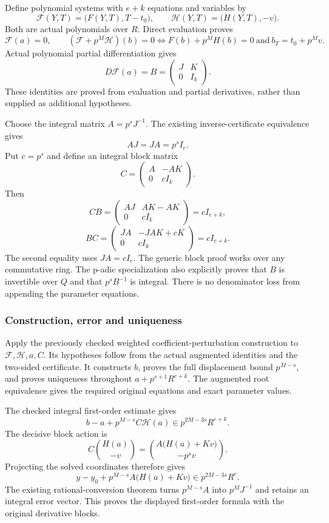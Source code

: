 Define polynomial systems with \(e+k\) equations and variables by \[
\mathcal F(Y,T)=\bigl(F(Y,T),T-t_0\bigr),\qquad
\mathcal H(Y,T)=\bigl(H(Y,T),-v\bigr).
\] Both are actual polynomials over \(R\). Direct evaluation proves \[
\mathcal F(a)=0,
\qquad
(\mathcal F+p^M\mathcal H)(b)=0
\iff F(b)+p^MH(b)=0\ \text{and}\ b_T=t_0+p^Mv.
\] Actual polynomial partial differentiation gives \[
D\mathcal F(a)=B=\begin{pmatrix}J&K\\0&I_k\end{pmatrix}.
\] These identities are proved from evaluation and partial derivatives,
rather than supplied as additional hypotheses.

Choose the integral matrix \(A=p^sJ^{-1}\). The existing
inverse-certificate equivalence gives \[
AJ=JA=p^sI_e.
\] Put \(c=p^s\) and define an integral block matrix \[
C=\begin{pmatrix}A&-AK\\0&cI_k\end{pmatrix}.
\] Then \[
CB=\begin{pmatrix}AJ&AK-AK\\0&cI_k\end{pmatrix}=cI_{e+k},
\] \[
BC=\begin{pmatrix}JA&-JAK+cK\\0&cI_k\end{pmatrix}=cI_{e+k}.
\] The second equality uses \(JA=cI_e\). The generic block proof works
over any commutative ring. The p-adic specialization also explicitly
proves that \(B\) is invertible over \(Q\) and that \(p^sB^{-1}\) is
integral. There is no denominator loss from appending the parameter
equations.

\hypertarget{cont10:construction-error-and-uniqueness}{%
\subsubsection{Construction, error and
uniqueness}\label{cont10:construction-error-and-uniqueness}}

Apply the previously checked weighted coefficient-perturbation
construction to \(\mathcal F,\mathcal H,a,C\). Its hypotheses follow
from the actual augmented identities and the two-sided certificate. It
constructs \(b\), proves the full displacement bound \(p^{M-s}\), and
proves uniqueness throughout \(a+p^{s+1}R^{e+k}\). The augmented root
equivalence gives the required original equations and exact parameter
values.

The checked integral first-order estimate gives \[
b-a+p^{M-s}C\mathcal H(a)\in p^{2M-3s}R^{e+k}.
\] The decisive block action is \[
C\binom{H(a)}{-v}
=
\binom{A\bigl(H(a)+Kv\bigr)}{-p^sv}.
\] Projecting the solved coordinates therefore gives \[
y-y_0+p^{M-s}A\bigl(H(a)+Kv\bigr)
\in p^{2M-3s}R^e.
\] The existing rational-conversion theorem turns \(p^{M-s}A\) into
\(p^MJ^{-1}\) and retains an integral error vector. This proves the
displayed first-order formula with the original derivative blocks.

